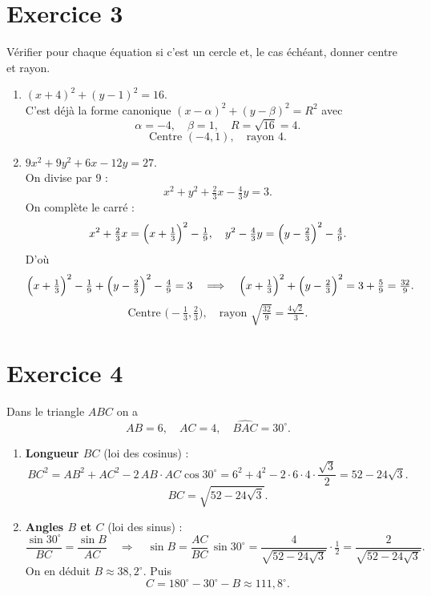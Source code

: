 \documentclass{article}
\theoremstyle{definition}
\begin{document}
\section*{Exercice 3}
Vérifier pour chaque équation si c’est un cercle et, le cas échéant, donner centre et rayon.
\begin{enumerate}
  \item \((x+4)^2+(y-1)^2=16\).\\
    C’est déjà la forme canonique \((x-\alpha)^2+(y-\beta)^2=R^2\) avec  
    \[
      \alpha=-4,\quad \beta=1,\quad R=\sqrt{16}=4.
    \]
    \[
      \boxed{\text{Centre }(-4,1),\quad\text{rayon }4.}
    \]
  
  \item \(9x^2+9y^2+6x-12y=27\).\\
    On divise par 9 :
    \[
      x^2+y^2+\tfrac{2}{3}x - \tfrac{4}{3}y = 3.
    \]
    On complète le carré :
    \[
      x^2 + \tfrac{2}{3}x
      = \Bigl(x + \tfrac{1}{3}\Bigr)^2 - \tfrac{1}{9},
      \quad
      y^2 - \tfrac{4}{3}y
      = \Bigl(y - \tfrac{2}{3}\Bigr)^2 - \tfrac{4}{9}.
    \]
    D'où
    \[
      \Bigl(x + \tfrac{1}{3}\Bigr)^2 - \tfrac{1}{9}
      + \Bigl(y - \tfrac{2}{3}\Bigr)^2 - \tfrac{4}{9}
      = 3
      \quad\Longrightarrow\quad
      \Bigl(x + \tfrac{1}{3}\Bigr)^2 + \Bigl(y - \tfrac{2}{3}\Bigr)^2
      = 3 + \tfrac{5}{9}
      = \tfrac{32}{9}.
    \]
    \[
      \boxed{\text{Centre }\bigl(-\tfrac{1}{3},\tfrac{2}{3}\bigr),\quad
      \text{rayon }\sqrt{\tfrac{32}{9}} = \tfrac{4\sqrt2}{3}.}
    \]
\end{enumerate}

\section*{Exercice 4}
Dans le triangle \(ABC\) on a
\[
AB=6,\quad AC=4,\quad \widehat{BAC}=30^\circ.
\]
\begin{enumerate}
  \item \textbf{Longueur \(BC\)} (loi des cosinus) :
    \[
      BC^2 = AB^2 + AC^2 - 2\,AB\cdot AC \cos 30^\circ
      = 6^2 + 4^2 - 2\cdot6\cdot4\cdot\frac{\sqrt3}{2}
      = 52 - 24\sqrt3.
    \]
    \[
      \boxed{BC = \sqrt{52 - 24\sqrt3}.}
    \]
  \item \textbf{Angles \(B\) et \(C\)} (loi des sinus) :\\
    \[
      \frac{\sin 30^\circ}{BC} = \frac{\sin B}{AC}
      \quad\Longrightarrow\quad
      \sin B = \frac{AC}{BC}\,\sin30^\circ
             = \frac{4}{\sqrt{52-24\sqrt3}}\cdot\tfrac12
             = \frac{2}{\sqrt{52-24\sqrt3}}.
    \]
    On en déduit \(B\approx38{,}2^\circ\).  
    Puis 
    \[
      C = 180^\circ - 30^\circ - B \approx 111{,}8^\circ.
    \]
\end{enumerate}
\end{document}
